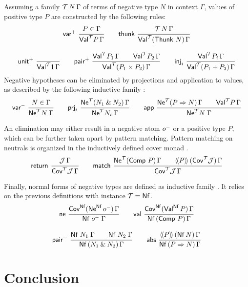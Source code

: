 \documentclass[a4paper,USenglish,cleveref, autoref]{lipics-v2019}
\begin{document}
Assuming a family $\mathcal{T}\,N\,\Gamma$ of terms of negative type $N$ in
context $\Gamma$, values 
of positive type $P$ are constructed by the
following rules:
\begin{gather*}
  \nru{\pvar}{P \in \Gamma}{\PValT P \Gamma}
\qquad
  \nru{\tthunk}{\T\,N\,\Gamma}{\PValTP{\Thunk\,N}\Gamma}
\\[2ex]
  \nru{\punit}{}{\PValT{\tyone}\Gamma}
\qquad
  \nru{\ppair}
      {\PValT{P_1}\Gamma \qquad \PValT{P_2}\Gamma}
      {\PValTP{P_1 \times P_2}\Gamma}
\qquad
  \nru{\tinj_i}{\PValT{P_i}\Gamma}{\PValTP{P_1 + P_2}\Gamma}
\end{gather*}
Negative hypotheses can be eliminated by projections and application
to values, as described by the following inductive family
:
\begin{gather*}
  \nru{\nvar}{N \in \Gamma}{\NeT N \Gamma}
\qquad
  \nru{\tprj_i}
      {\NeTP {N_1 \ntimes N_2} \Gamma}
      {\NeT {N_i} \Gamma}
\qquad
  \nru{\tapp}
      {\NeTP {P \To N} \Gamma \qquad \PValT P \Gamma}
      {\NeT N \Gamma}
\end{gather*}

An elimination may either result in a negative atom $o^-$ or a
positive type $P$, which can be further taken apart by pattern
matching.  Pattern matching on neutrals is organized in the
inductively defined cover monad \fbox{$\Cov[\T]$}.
\begin{gather*}
  \nru{\treturn}{\J\,\Gamma}{\CoverT \J \Gamma}
\qquad
  \nru{\tmatch}
      {\NeTP {\Comp\,P} \Gamma \qquad \AddHypP P {\Cov[\T]\J} \Gamma}
      {\CoverT \J \Gamma}
\end{gather*}

Finally, normal forms of negative types are defined as inductive
family .  It relies on the previous definitions
with instance $\mathcal{T} = \mathsf{Nf}$.
\begin{gather*}
  \nru{\tne}
      {\Cov[\tNf](\tNe[\tNf]\,\natom)\,\Gamma}
      {\Nf {\natom} \Gamma}
\qquad
  \nru{\tval}
      {\Cov[\tNf](\tVal[\tNf]\,P)\,\Gamma}
      {\NfP {\Comp\,P} \Gamma}
\\[2ex]
  \nru{\npair}
      {\Nf {N_1} \Gamma \qquad \Nf {N_2} \Gamma}
      {\NfP {N_1 \ntimes N_2} \Gamma}
\qquad
  \nru{\tabs}
      {\AddHypP P {\tNf\, N} \Gamma}
      {\NfP {P \To N} \Gamma}
\end{gather*}


\section{Conclusion}
\label{sec:concl}



\end{document}
